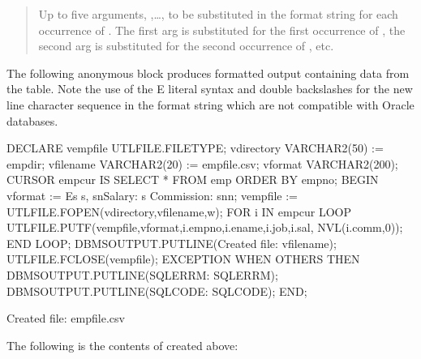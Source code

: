 \documentclass[letterpaper,10pt,english,openany,oneside]{sphinxmanual}
\begin{document}
\begin{quote}

Up to five arguments, ,…, to be substituted in the
format string for each occurrence of . The first arg is substituted
for the first occurrence of , the second arg is substituted for the
second occurrence of , etc.
\end{quote}


The following anonymous block produces formatted output containing data
from the  table. Note the use of the E literal syntax and double
backslashes for the new line character sequence in the format string
which are not compatible with Oracle databases.

%
\begin{sphinxVerbatim}[commandchars=\\\{\}]
DECLARE
    v\PYGZus{}empfile       UTL\PYGZus{}FILE.FILE\PYGZus{}TYPE;
    v\PYGZus{}directory     VARCHAR2(50) := \PYGZsq{}empdir\PYGZsq{};
    v\PYGZus{}filename      VARCHAR2(20) := \PYGZsq{}empfile.csv\PYGZsq{};
    v\PYGZus{}format        VARCHAR2(200);
    CURSOR emp\PYGZus{}cur IS SELECT * FROM emp ORDER BY empno;
BEGIN
    v\PYGZus{}format := E\PYGZsq{}\PYGZpc{}s \PYGZpc{}s, \PYGZpc{}s\PYGZbs{}\PYGZbs{}nSalary: \PYGZdl{}\PYGZpc{}s Commission: \PYGZdl{}\PYGZpc{}s\PYGZbs{}\PYGZbs{}n\PYGZbs{}\PYGZbs{}n\PYGZsq{};
    v\PYGZus{}empfile := UTL\PYGZus{}FILE.FOPEN(v\PYGZus{}directory,v\PYGZus{}filename,\PYGZsq{}w\PYGZsq{});
    FOR i IN emp\PYGZus{}cur LOOP
        UTL\PYGZus{}FILE.PUTF(v\PYGZus{}empfile,v\PYGZus{}format,i.empno,i.ename,i.job,i.sal,
            NVL(i.comm,0));
    END LOOP;
    DBMS\PYGZus{}OUTPUT.PUT\PYGZus{}LINE(\PYGZsq{}Created file: \PYGZsq{} \textbar{}\textbar{} v\PYGZus{}filename);
    UTL\PYGZus{}FILE.FCLOSE(v\PYGZus{}empfile);
EXCEPTION
    WHEN OTHERS THEN
        DBMS\PYGZus{}OUTPUT.PUT\PYGZus{}LINE(\PYGZsq{}SQLERRM: \PYGZsq{} \textbar{}\textbar{} SQLERRM);
        DBMS\PYGZus{}OUTPUT.PUT\PYGZus{}LINE(\PYGZsq{}SQLCODE: \PYGZsq{} \textbar{}\textbar{} SQLCODE);
END;

Created file: empfile.csv
\end{sphinxVerbatim}

The following is the contents of  created above:
\end{document}
